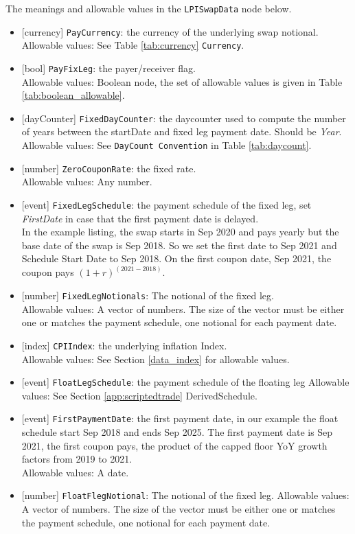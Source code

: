 The meanings and allowable values in the \lstinline!LPISwapData! node below.

\begin{itemize}
  \item{}[currency] \lstinline!PayCurrency!:  the currency of the underlying swap notional. \\
  Allowable values: See Table \ref{tab:currency} \lstinline!Currency!.
  \item{}[bool] \lstinline!PayFixLeg!: the payer/receiver flag. \\
    Allowable values: Boolean node, the set of allowable values is given in Table \ref{tab:boolean_allowable}.
  \item{}[dayCounter] \lstinline!FixedDayCounter!:  the daycounter used to compute the number of years between the startDate and fixed leg payment date. Should be \emph{Year}.\\
    Allowable values: See \lstinline!DayCount Convention! in Table \ref{tab:daycount}.
  \item{}[number] \lstinline!ZeroCouponRate!: the fixed rate.\\
    Allowable values: Any number.
\item{}[event] \lstinline!FixedLegSchedule!: the payment schedule of the fixed leg, set \emph{FirstDate} in case that the first payment date is delayed. \\
In the example listing, the swap starts in Sep 2020 and pays yearly but the base date of the swap is Sep 2018. So we set the first date to Sep 2021 and Schedule Start Date to Sep 2018. On the first coupon date, Sep 2021, the coupon pays $(1+r)^(2021-2018)$.
\item{}[number] \lstinline!FixedLegNotionals!: The notional of the fixed leg.\\
Allowable values: A vector of numbers. The size of the vector must be either one or matches the payment schedule, one notional for each payment date.
  \item{}[index] \lstinline!CPIIndex!:  the underlying inflation Index. \\
  Allowable values: See Section \ref{data_index} for allowable values.
\item{}[event] \lstinline!FloatLegSchedule!: the payment schedule of the floating leg
  Allowable values: See Section \ref{app:scriptedtrade} DerivedSchedule.
\item{}[event] \lstinline!FirstPaymentDate!: the first payment date, in our example the float schedule start Sep 2018 and ends Sep 2025. The first payment date is Sep 2021, the first coupon pays, the product of the capped floor YoY growth factors from 2019 to 2021.\\
Allowable values: A date.
  \item{}[number] \lstinline!FloatFlegNotional!: The notional of the fixed leg.
  Allowable values: A vector of numbers. The size of the vector must be either one or matches the payment schedule, one notional for each payment date.


\end{itemize}
